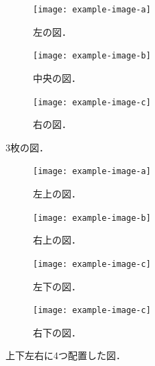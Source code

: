 \begin{figure}[tp]
    \centering
    \begin{subfigure}{0.32\columnwidth}
        \centering
        \texttt{[image: example-image-a]}
        \caption{左の図．}
        \label{subfig:three_figures_a}
    \end{subfigure}
    \hfill %
    \begin{subfigure}{0.32\columnwidth}
        \centering
        \texttt{[image: example-image-b]}
        \caption{中央の図．}
        \label{subfig:three_figures_b}
    \end{subfigure}
    \hfill %
    \begin{subfigure}{0.32\columnwidth}
        \centering
        \texttt{[image: example-image-c]}
        \caption{右の図．}
        \label{subfig:three_figures_c}
    \end{subfigure}
    \caption{3枚の図．}
    \label{fig:three_figures}
\end{figure}

\begin{figure}[tp]
    \centering
    \begin{subfigure}{0.45\columnwidth}
        \centering
        \texttt{[image: example-image-a]}
        \caption{左上の図．}
        \label{subfig:four_figures_a}
    \end{subfigure}
    \hfill %
    \begin{subfigure}{0.45\columnwidth}
        \centering
        \texttt{[image: example-image-b]}
        \caption{右上の図．}
        \label{subfig:four_figures_b}
    \end{subfigure}

    \vspace{5mm} %
    \begin{subfigure}{0.45\columnwidth}
        \centering
        \texttt{[image: example-image-c]}
        \caption{左下の図．}
        \label{subfig:four_figures_c}
    \end{subfigure}
    \hfill %
    \begin{subfigure}{0.45\columnwidth}
        \centering
        \texttt{[image: example-image-c]}
        \caption{右下の図．}
        \label{subfig:four_figures_c2}
    \end{subfigure}
    \caption{上下左右に4つ配置した図．}
    \label{fig:four_figures}
\end{figure}

